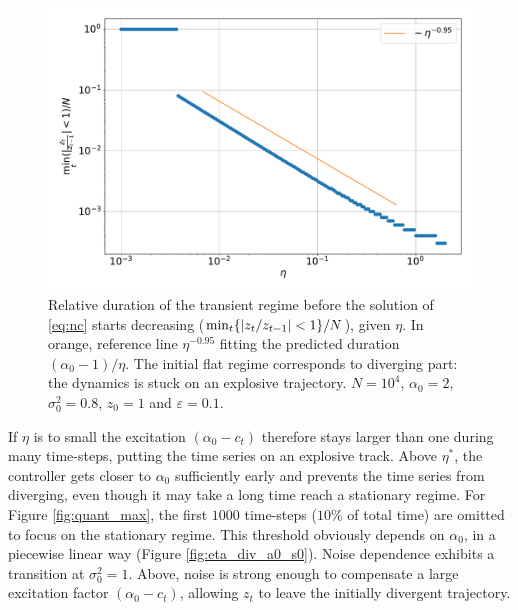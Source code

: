 \documentclass[FinalReport.tex]{subfiles}
\begin{document}
\begin{figure}[h!]
\centering
	\centering
	\includegraphics[width=.8\textwidth]{Graphs/nc_conv.pdf}
	\caption{Relative duration of the transient regime before the solution of \eqref{eq:nc} starts decreasing ($\min_t\{\abs{z_t/z_{t-1}}<1\}/N$), given $\eta$. In orange, reference line $\eta^{-0.95}$ fitting the predicted duration $(\alpha_0-1)/\eta$. The initial flat regime corresponds to diverging part: the dynamics is stuck on an explosive trajectory. $N=10^4$, $\alpha_0=2$, $\sigma_0^2=0.8$, $z_0=1$ and $\varepsilon=0.1$.}
	\label{fig:nc_conv}	
\end{figure}
 
 If $\eta$ is to small the excitation $(\alpha_0-c_t)$ therefore stays larger than one during many time-steps, putting the time series on an explosive track. Above $\eta^*$, the controller gets closer to $\alpha_0$ sufficiently early and prevents the time series from diverging, even though it may take a long time reach a stationary regime. For Figure \ref{fig:quant_max}, the first $1000$ time-steps ($10\%$ of total time) are omitted to focus on the stationary regime. This threshold obviously depends on $\alpha_0$, in a piecewise linear way  (Figure \ref{fig:eta_div_a0_s0}). Noise dependence exhibits a transition at $\sigma_0^2=1$. Above, noise is strong enough to compensate a large excitation factor $(\alpha_0-c_t)$, allowing $z_t$ to leave the initially divergent trajectory.
\end{document}
